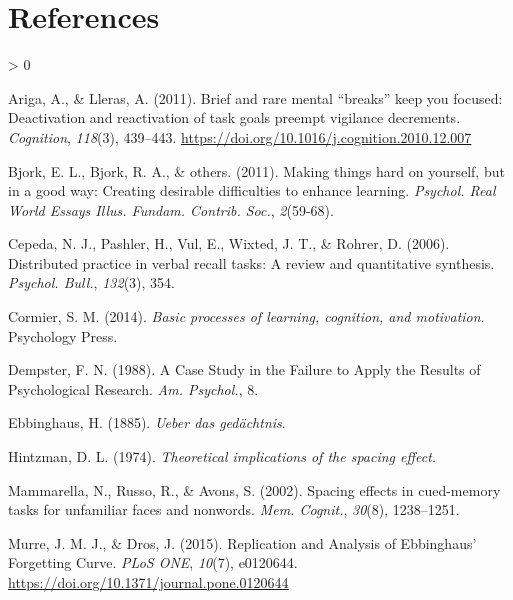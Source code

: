 \documentclass[
  notoc %
]{tufte-book}
\newlength{\cslhangindent}
\newenvironment{CSLReferences}[2] %
 {%
  \setlength{\parindent}{0pt}
  \ifodd #1 \everypar{\setlength{\hangindent}{\cslhangindent}}\ignorespaces\fi
  \ifnum #2 > 0
  \setlength{\parskip}{#2\baselineskip}
  \fi
 }%
 {}
\begin{document}
\hypertarget{references}{%
\chapter*{References}\label{references}}

\hypertarget{refs}{}
\begin{CSLReferences}{1}{0}
\leavevmode\hypertarget{ref-arigaBriefRareMental2011}{}%
Ariga, A., \& Lleras, A. (2011). Brief and rare mental {``breaks''} keep
you focused: {Deactivation} and reactivation of task goals preempt
vigilance decrements. \emph{Cognition}, \emph{118}(3), 439--443.
\url{https://doi.org/10.1016/j.cognition.2010.12.007}

\leavevmode\hypertarget{ref-bjork2011making}{}%
Bjork, E. L., Bjork, R. A., \& others. (2011). Making things hard on
yourself, but in a good way: {Creating} desirable difficulties to
enhance learning. \emph{Psychol. Real World Essays Illus. Fundam.
Contrib. Soc.}, \emph{2}(59-68).

\leavevmode\hypertarget{ref-cepeda2006distributed}{}%
Cepeda, N. J., Pashler, H., Vul, E., Wixted, J. T., \& Rohrer, D.
(2006). Distributed practice in verbal recall tasks: {A} review and
quantitative synthesis. \emph{Psychol. Bull.}, \emph{132}(3), 354.

\leavevmode\hypertarget{ref-cormier2014basic}{}%
Cormier, S. M. (2014). \emph{Basic processes of learning, cognition, and
motivation}. {Psychology Press}.

\leavevmode\hypertarget{ref-dempsterCaseStudyFailure1988}{}%
Dempster, F. N. (1988). A {Case Study} in the {Failure} to {Apply} the
{Results} of {Psychological Research}. \emph{Am. Psychol.}, 8.

\leavevmode\hypertarget{ref-ebbinghaus1885ueber}{}%
Ebbinghaus, H. (1885). \emph{Ueber das gedächtnis}.

\leavevmode\hypertarget{ref-hintzman1974theoretical}{}%
Hintzman, D. L. (1974). \emph{Theoretical implications of the spacing
effect.}

\leavevmode\hypertarget{ref-mammarella2002spacing}{}%
Mammarella, N., Russo, R., \& Avons, S. (2002). Spacing effects in
cued-memory tasks for unfamiliar faces and nonwords. \emph{Mem.
Cognit.}, \emph{30}(8), 1238--1251.

\leavevmode\hypertarget{ref-murreReplicationAnalysisEbbinghaus2015}{}%
Murre, J. M. J., \& Dros, J. (2015). Replication and {Analysis} of
{Ebbinghaus}' {Forgetting Curve}. \emph{PLoS ONE}, \emph{10}(7),
e0120644. \url{https://doi.org/10.1371/journal.pone.0120644}


\end{CSLReferences}
\end{document}
